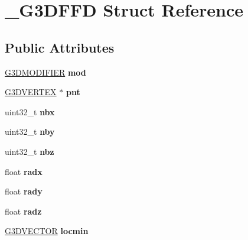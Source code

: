 \hypertarget{struct__G3DFFD}{}\section{\+\_\+\+G3\+D\+F\+FD Struct Reference}
\label{struct__G3DFFD}
\subsection*{Public Attributes}
\begin{DoxyCompactItemize}
\item 
\mbox{\label{struct__G3DFFD_af332a323b8681d06e35240a0b88a151a}} 
\hyperlink{struct__G3DMODIFIER}{G3\+D\+M\+O\+D\+I\+F\+I\+ER} {\bfseries mod}
\item 
\mbox{\label{struct__G3DFFD_a537a90f679633872771e4fa50f5c6987}} 
\hyperlink{struct__G3DVERTEX}{G3\+D\+V\+E\+R\+T\+EX} $\ast$ {\bfseries pnt}
\item 
\mbox{\label{struct__G3DFFD_a4d4c125d64a6327a4f930e6ddb0bba48}} 
uint32\+\_\+t {\bfseries nbx}
\item 
\mbox{\label{struct__G3DFFD_a6be8e719c147b7311bb1546058bed6fc}} 
uint32\+\_\+t {\bfseries nby}
\item 
\mbox{\label{struct__G3DFFD_a5cc7bf7898286cf510a81805ac45389e}} 
uint32\+\_\+t {\bfseries nbz}
\item 
\mbox{\label{struct__G3DFFD_a0c86b2ff94056580c6f60a53feab9f56}} 
float {\bfseries radx}
\item 
\mbox{\label{struct__G3DFFD_a71ab1c0c49438b797fcd4aff9c801068}} 
float {\bfseries rady}
\item 
\mbox{\label{struct__G3DFFD_a5865a0917ae8ba9a5064446fbf138e1b}} 
float {\bfseries radz}
\item 
\mbox{\label{struct__G3DFFD_a82b040804aee92589baff57228d1b604}} 
\hyperlink{structG3DVECTOR}{G3\+D\+V\+E\+C\+T\+OR} {\bfseries locmin}
\item 
\mbox{\label{struct__G3DFFD_a10f61d27c00a7e9bc6a503cdb0a75628}} 

\end{DoxyCompactItemize}
